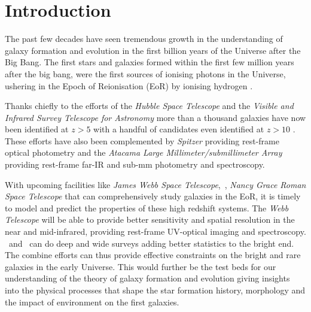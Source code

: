 \section{Introduction}\label{sec:intro}
The past few decades have seen tremendous growth in the understanding of galaxy formation and evolution in the first billion years of the Universe after the Big Bang. The first stars and galaxies formed within the first few million years after the big bang, were the first sources of ionising photons in the Universe, ushering in the Epoch of Reionisation (EoR) by ionising hydrogen \citep[\eg][]{wilkins2011,Bouwens2012b,Robertson2013,Robertson2015}. 


Thanks chiefly to the efforts of the \textit{Hubble Space Telescope} \citep[\hst\,, \eg][]{Beckwith_2006,Bouwens2008,Labbe2010,Robertson2010,Bouwens2014a,McLeod2015,Bowler2017,Kawamata_2018} and the \textit{Visible and Infrared Survey Telescope for Astronomy} \citep[\textit{VISTA}, \eg][]{Bowler2014, Stefanon2019,Bowler2020} more than a thousand galaxies have now been identified at $z>5$ with a handful of candidates even identified at $z>10$ \citep[\eg][]{Oesch_2016,Bouwens_2019}. These efforts have also been complemented by \textit{Spitzer} providing rest-frame optical photometry \citep[\eg][]{Ashby_2013,Roberts_Borsani_2016,Bridge_2019} and the \textit{Atacama Large Millimeter/submillimeter Array}  \citep[\textit{ALMA}, \eg][]{Smit2018,Carniani2018,Hashimoto2019} providing rest-frame far-IR and sub-mm photometry and spectroscopy.

With upcoming facilities like \textit{James Webb Space Telescope}, \euclid\,, \textit{Nancy Grace Roman Space Telescope} that can comprehensively study galaxies in the EoR, it is timely to model and predict the properties of these high redshift systems. The \textit{Webb Telescope} will be able to provide better sensitivity and spatial resolution in the near and mid-infrared, providing rest-frame UV-optical imaging and spectroscopy. \euclid\, and \rst\, can do deep and wide surveys adding better statistics to the bright end. The combine efforts can thus provide effective constraints on the bright and rare galaxies in the early Universe. This would further be the test beds for our understanding of the theory of galaxy formation and evolution giving insights into the physical processes that shape the star formation history, morphology and the impact of environment on the first galaxies.

